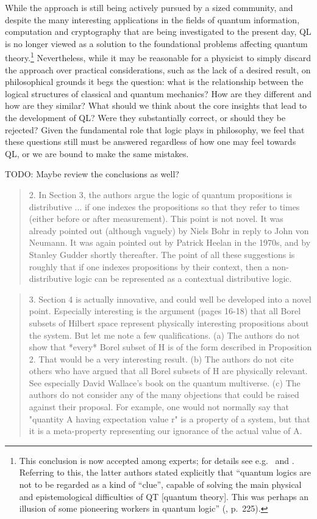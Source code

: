 \documentclass[11pt]{article}
\newcommand\change[1]{{\color{red!75!black} #1}}
\begin{document}
\change{While the approach is still being actively pursued by a sized community, and despite the many interesting applications in the fields of quantum information, computation and cryptography that are being investigated to the present day, QL is no longer viewed as a solution to the foundational problems affecting quantum theory.\footnote{This conclusion is now accepted among experts; for details see e.g.\ \cite{Bacciagaluppi:2009} and \cite{Giuntini:2002}. Referring to this, the latter authors stated explicitly that ``quantum logics are not to be regarded as a kind of ``clue'', capable of solving the main physical and epistemological difficulties of QT [quantum theory]. This was perhaps an illusion of some pioneering workers in quantum logic'' (\cite{Giuntini:2002}, p.\ 225).} Nevertheless, while it may be reasonable for a physicist to simply discard the approach over practical considerations, such as the lack of a desired result, on philosophical grounds it begs the question: what is the relationship between the logical structures of classical and quantum mechanics? How are they different and how are they similar? What should we think about the core insights that lead to the development of QL? Were they substantially correct, or should they be rejected? Given the fundamental role that logic plays in philosophy, we feel that these questions still must be answered regardless of how one may feel towards QL, or we are bound to make the same mistakes.}

TODO: Maybe review the conclusions as well?


\begin{quote}
2. In Section 3, the authors argue the logic of quantum propositions is distributive ... if one indexes the propositions so that they refer to times (either before or after measurement). This point is not novel. It was already pointed out (although vaguely) by Niels Bohr in reply to John von Neumann. It was again pointed out by Patrick Heelan in the 1970s, and by Stanley Gudder shortly thereafter. The point of all these suggestions is roughly that if one indexes propositions by their context, then a non-distributive logic can be represented as a contextual distributive logic. 
\end{quote}


\begin{quote}
3. Section 4 is actually innovative, and could well be developed into a novel point. Especially interesting is the argument (pages 16-18) that all Borel subsets of Hilbert space represent physically interesting propositions about the system. But let me note a few qualifications. (a) The authors do not show that *every* Borel subset of H is of the form described in Proposition 2. That would be a very interesting result. (b) The authors do not cite others who have argued that all Borel subsets of H are physically relevant. See especially David Wallace's book on the quantum multiverse. (c) The authors do not consider any of the many objections that could be raised against their proposal. For example, one would not normally say that "quantity A having expectation value r" is a property of a system, but that it is a meta-property representing our ignorance of the actual value of A.
\end{quote}
\end{document}
